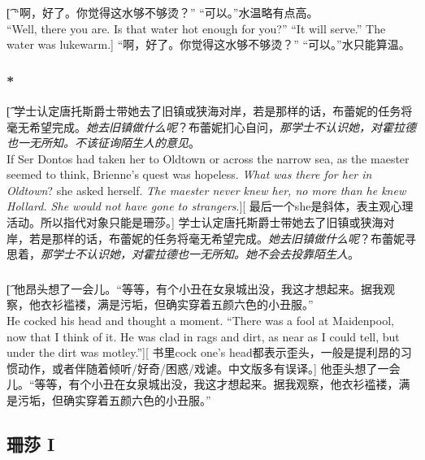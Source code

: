 \documentclass[12pt,a4paper]{article}
\begin{document}
\subsubsection{}\t[
	“啊，好了。你觉得这水够不够烫？”
	“可以。”水温略有点高。\\	
	“Well, there you are. Is that water hot enough for you?”
	“It will serve.” The water was lukewarm.]
	“啊，好了。你觉得这水够不够烫？”
	“可以。”水只能算温。
	
\subsubsection{\color{red}*}\t[	
	学士认定唐托斯爵士带她去了旧镇或狭海对岸，若是那样的话，布蕾妮的任务将毫无希望完成。\emph{她去旧镇做什么呢}？布蕾妮扪心自问，\emph{那学士不认识她，对霍拉德也一无所知。不该征询陌生人的意见}。\\
	If Ser Dontos had taken her to Oldtown or across the narrow sea, as the maester seemed to think, Brienne's quest was hopeless. \emph{What was there for her in Oldtown}? she asked herself. \emph{The maester never knew her, no more than he knew Hollard. She would not have gone to strangers}.][
	最后一个she是斜体，表主观心理活动。所以指代对象只能是珊莎。]
	学士认定唐托斯爵士带她去了旧镇或狭海对岸，若是那样的话，布蕾妮的任务将毫无希望完成。\emph{她去旧镇做什么呢}？布蕾妮寻思着，\emph{那学士不认识她，对霍拉德也一无所知。她不会去投靠陌生人}。
	
\subsubsection{}\t[	
	他昂头想了一会儿。“等等，有个小丑在女泉城出没，我这才想起来。据我观察，他衣衫褴褛，满是污垢，但确实穿着五颜六色的小丑服。”\\
	He cocked his head and thought a moment. “There was a fool at Maidenpool, now that I think of it. He was clad in rags and dirt, as near as I could tell, but under the dirt was motley.”][
	书里cock one's head都表示歪头，一般是提利昂的习惯动作，或者伴随着倾听/好奇/困惑/戏谑。中文版多有误译。]
	他歪头想了一会儿。“等等，有个小丑在女泉城出没，我这才想起来。据我观察，他衣衫褴褛，满是污垢，但确实穿着五颜六色的小丑服。”
	
\subsection{珊莎 I}
\end{document}
